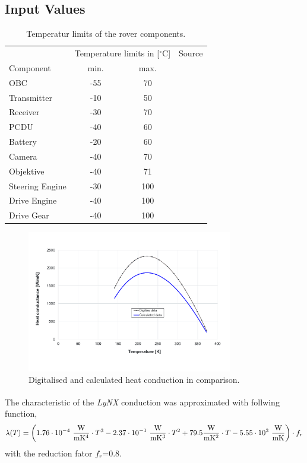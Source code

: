 \subsection{Input Values} \label{sec:app_therm_5}
\begin{table}[H]
	\centering
	\caption{Temperatur limits of the rover components.}
	\begin{tabular}{lccc}
		\hline 
		& \multicolumn{2}{l}{Temperature limits in [$^\circ$C]} & Source\\ 
		Component	&	min. & max. &\\\hline
		OBC & -55 & 70 & \\
		Transmitter & -10 & 50 & \\
		Receiver & -30 & 70 & \\
		PCDU & -40 & 60 & \\
		Battery & -20 & 60 & \cite{SAFTBatteries.2018}\\
		Camera & -40 & 70  & \\
		Objektive  & -40 & 71 & \\
		Steering Engine & -30 & 100 & \\
		Drive Engine & -40 & 100 & \\
		Drive Gear & -40 & 100  & \\ \hline
	\end{tabular}
	\label{tab:tcs_limits}
\end{table}

\begin{figure}[H] 
	\centering
	\includegraphics[width=0.8\textwidth]{Media/tcs_lynx_calc}
	\caption{Digitalised \cite{ref_tcs_01} and calculated heat conduction in comparison.}
	\label{fig:tcs_lynx}
\end{figure}
The characteristic of the \textit{LyNX}\textsuperscript{\tiny\textregistered} conduction was approximated with follwing function,
\begin{equation}
\lambda(T)= \left(1.76 \cdot 10^{-4}\ \frac{\W}{\m \K^4} \cdot T^3 -2.37\cdot 10^{-1}\ \frac{\W}{\m \K^3} \cdot T^2 +79.5 \frac{\W}{\m \K^2} \cdot T -5.55\cdot 10^{3}\ \frac{\W}{\m \K}\right) \cdot f_{r}  
\label{eq:tcs_lynx}
\end{equation}
with the reduction fator $f_{r}$=0.8.

